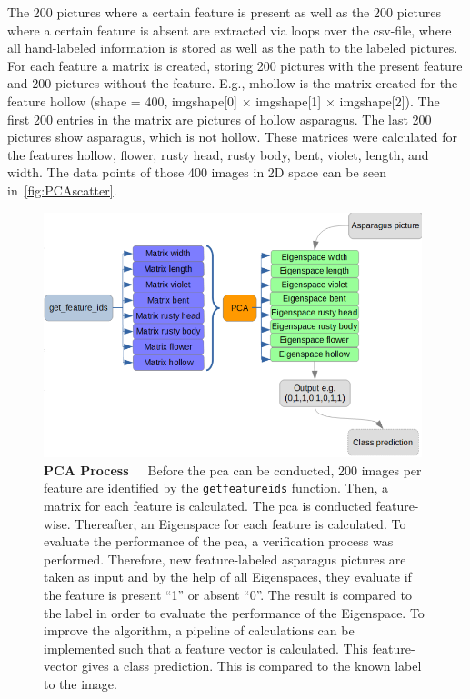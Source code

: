 The 200 pictures where a certain feature is present as well as the 200 pictures where a certain feature is absent are extracted via loops over the csv-file, where all hand-labeled information is stored as well as the path to the labeled pictures. For each feature a matrix is created, storing 200 pictures with the present feature and 200 pictures without the feature. E.g., m\textunderscore hollow is the matrix created for the feature hollow (shape = 400, img\textunderscore shape[0] $\times$ img\textunderscore shape[1] $\times$ img\textunderscore shape[2]). The first 200 entries in the matrix are pictures of hollow asparagus. The last 200 pictures show asparagus, which is not hollow. These matrices were calculated for the features hollow, flower, rusty head, rusty body, bent, violet, length, and width. The data points of those 400 images in 2D space can be seen in~\autoref{fig:PCAscatter}.

\begin{figure}[!htb]
	\centering
	\includegraphics[width=0.98\textwidth]{Figures/chapter04/pca_process.png}
	\decoRule
	\caption[PCA Process]{\textbf{PCA Process}~~~Before the \acrshort{pca} can be conducted, 200 images per feature are identified by the \texttt{get\textunderscore feature\textunderscore ids} function. Then, a matrix for each feature is calculated. The \acrshort{pca} is conducted feature-wise. Thereafter, an Eigenspace for each feature is calculated. To evaluate the performance of the \acrshort{pca}, a verification process was performed. Therefore, new feature-labeled asparagus pictures are taken as input and by the help of all Eigenspaces, they evaluate if the feature is present \enquote{1} or absent \enquote{0}. The result is compared to the label in order to evaluate the performance of the Eigenspace. To improve the algorithm, a pipeline of calculations can be implemented such that a feature vector is calculated. This feature-vector gives a class prediction. This is compared to the known label to the image.}
	\label{fig:PCAprocess}
\end{figure}

